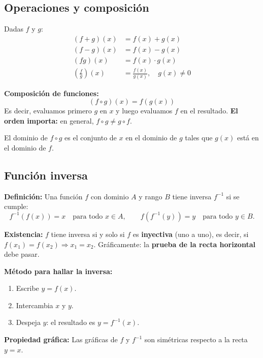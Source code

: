 \documentclass[12pt, a4paper]{article}
\begin{document}
\subsection{Operaciones y composición}

\begin{cuadroteoria}
  Dadas $f$ y $g$:
  \begin{align*}
    (f + g)(x)                  & = f(x) + g(x)                          \\
    (f - g)(x)                  & = f(x) - g(x)                          \\
    (fg)(x)                     & = f(x) \cdot g(x)                      \\
    \left(\frac{f}{g}\right)(x) & = \frac{f(x)}{g(x)}, \quad g(x) \neq 0
  \end{align*}
\end{cuadroteoria}

\begin{cuadrosolucion}
  \textbf{Composición de funciones:}
  $$(f \circ g)(x) = f(g(x))$$
  Es decir, evaluamos primero $g$ en $x$ y luego evaluamos $f$ en el resultado. \textbf{El orden importa:} en general, $f \circ g \neq g \circ f$.

  El dominio de $f \circ g$ es el conjunto de $x$ en el dominio de $g$ tales que $g(x)$ está en el dominio de $f$.
\end{cuadrosolucion}

\newpage

\subsection{Función inversa}

\begin{cuadroteoria}
  \textbf{Definición:} Una función $f$ con dominio $A$ y rango $B$ tiene inversa $f^{-1}$ si se cumple:
  $$f^{-1}(f(x)) = x \quad \text{para todo } x \in A, \qquad f(f^{-1}(y)) = y \quad \text{para todo } y \in B.$$

  \textbf{Existencia:} $f$ tiene inversa si y solo si $f$ es \textbf{inyectiva} (uno a uno), es decir, si $f(x_1) = f(x_2) \Rightarrow x_1 = x_2$. Gráficamente: la \textbf{prueba de la recta horizontal} debe pasar.

  \textbf{Método para hallar la inversa:}
  \begin{enumerate}[leftmargin=*]
    \item Escribe $y = f(x)$.
    \item Intercambia $x$ y $y$.
    \item Despeja $y$: el resultado es $y = f^{-1}(x)$.
  \end{enumerate}

  \textbf{Propiedad gráfica:} Las gráficas de $f$ y $f^{-1}$ son simétricas respecto a la recta $y = x$.
\end{cuadroteoria}
\end{document}
